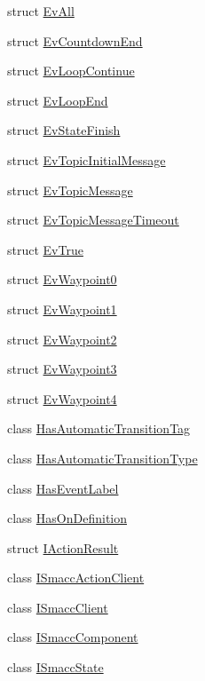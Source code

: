 \begin{DoxyCompactItemize}
\item 
struct \hyperlink{structsmacc_1_1EvAll}{Ev\+All}
\item 
struct \hyperlink{structsmacc_1_1EvCountdownEnd}{Ev\+Countdown\+End}
\item 
struct \hyperlink{structsmacc_1_1EvLoopContinue}{Ev\+Loop\+Continue}
\item 
struct \hyperlink{structsmacc_1_1EvLoopEnd}{Ev\+Loop\+End}
\item 
struct \hyperlink{structsmacc_1_1EvStateFinish}{Ev\+State\+Finish}
\item 
struct \hyperlink{structsmacc_1_1EvTopicInitialMessage}{Ev\+Topic\+Initial\+Message}
\item 
struct \hyperlink{structsmacc_1_1EvTopicMessage}{Ev\+Topic\+Message}
\item 
struct \hyperlink{structsmacc_1_1EvTopicMessageTimeout}{Ev\+Topic\+Message\+Timeout}
\item 
struct \hyperlink{structsmacc_1_1EvTrue}{Ev\+True}
\item 
struct \hyperlink{structsmacc_1_1EvWaypoint0}{Ev\+Waypoint0}
\item 
struct \hyperlink{structsmacc_1_1EvWaypoint1}{Ev\+Waypoint1}
\item 
struct \hyperlink{structsmacc_1_1EvWaypoint2}{Ev\+Waypoint2}
\item 
struct \hyperlink{structsmacc_1_1EvWaypoint3}{Ev\+Waypoint3}
\item 
struct \hyperlink{structsmacc_1_1EvWaypoint4}{Ev\+Waypoint4}
\item 
class \hyperlink{classsmacc_1_1HasAutomaticTransitionTag}{Has\+Automatic\+Transition\+Tag}
\item 
class \hyperlink{classsmacc_1_1HasAutomaticTransitionType}{Has\+Automatic\+Transition\+Type}
\item 
class \hyperlink{classsmacc_1_1HasEventLabel}{Has\+Event\+Label}
\item 
class \hyperlink{classsmacc_1_1HasOnDefinition}{Has\+On\+Definition}
\item 
struct \hyperlink{structsmacc_1_1IActionResult}{I\+Action\+Result}
\item 
class \hyperlink{classsmacc_1_1ISmaccActionClient}{I\+Smacc\+Action\+Client}
\item 
class \hyperlink{classsmacc_1_1ISmaccClient}{I\+Smacc\+Client}
\item 
class \hyperlink{classsmacc_1_1ISmaccComponent}{I\+Smacc\+Component}
\item 
class \hyperlink{classsmacc_1_1ISmaccState}{I\+Smacc\+State}

\end{DoxyCompactItemize}
